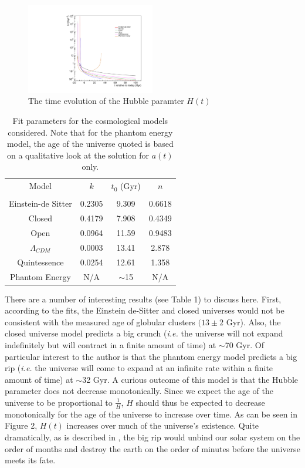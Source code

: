 \documentclass[aps,reprint,prl,floatfix,nofootinbib]{revtex4-1}
\begin{document}
\begin{figure}[H]
\includegraphics[width=0.5\textwidth]{ps1_plots/h1-6}
\caption{The time evolution of the Hubble paramter $H(t)$}
\end{figure}
\newpage
\begin{table}[h]
\begin{tabular}{c|c|c|c}
Model              & $k$    & $t_0$ (Gyr) & $n$    \\
                   &        &             &        \\ \hline
Einstein-de Sitter & 0.2305 & 9.309       & 0.6618 \\ \hline
Closed             & 0.4179 & 7.908       & 0.4349 \\ \hline
Open               & 0.0964 & 11.59       & 0.9483 \\ \hline
$\Lambda_{CDM}$    & 0.0003 & 13.41       & 2.878  \\ \hline
Quintessence       & 0.0254 & 12.61       & 1.358  \\ \hline
Phantom Energy     & N/A    & $\sim$15    & N/A   
\end{tabular}
\caption{Fit parameters for the cosmological models considered.  Note that for the phantom energy model, the age of the universe quoted is based on a qualitative look at the solution for $a(t)$ only.}
\end{table}
There are a number of interesting results (see Table 1) to discuss here.  First, according to the fits, the Einstein de-Sitter and closed universes would not be consistent with the measured age of globular clusters $(13\pm2$ Gyr).  Also, the closed universe model predicts a big crunch (\emph{i.e.} the universe will not expand indefinitely but will contract in a finite amount of time) at $\sim$70 Gyr.  Of particular interest to the author is that the phantom energy model predicts a big rip (\emph{i.e.} the universe will come to expand at an infinite rate within a finite amount of time) at $\sim$32 Gyr.  A curious outcome of this model is that the Hubble parameter does not decrease monotonically.  Since we expect the age of the universe to be proportional to $\frac{1}{H}$, $H$ should thus be expected to decrease monotonically for the age of the universe to increase over time.  As can be seen in Figure 2, $H(t)$ increases over much of the universe's existence.  Quite dramatically, as is described in \cite{Caldwell:2003vq}, the big rip would unbind our solar system on the order of months and destroy the earth on the order of minutes before the universe meets its fate.
\end{document}
